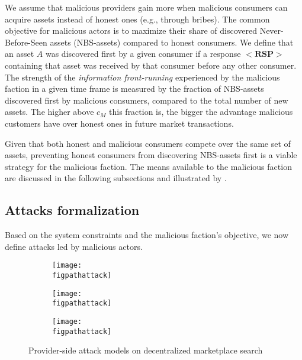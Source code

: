 We assume that malicious providers gain more when malicious consumers can acquire assets instead of honest ones (e.g., through bribes). 
The common objective for malicious actors is to maximize their share of discovered Never-Before-Seen assets (NBS-assets) compared to honest consumers.
We define that an asset $A$ was discovered first by a given consumer if a response $\mathbf{<RSP>}$ containing that asset was received by that consumer before any other consumer. 
The strength of the \emph{information front-running} experienced by the malicious faction in a given time frame is measured by the fraction of NBS-assets discovered first by malicious consumers, compared to the total number of new assets. 
The higher above $c_{M}$ this fraction is, the bigger the advantage malicious customers have over honest ones in future market transactions.

Given that both honest and malicious consumers compete over the same set of assets, preventing honest consumers from discovering NBS-assets first is a viable strategy for the malicious faction. 
The means available to the malicious faction are discussed in the following subsections and illustrated by .

\subsection{Attacks formalization}

Based on the system constraints and the malicious faction's objective, we now define attacks led by malicious actors.

\begin{figure}
    \centering
    \begin{subfigure}{\linewidth}
        \centering
    \texttt{[image: \\figpathattack]}
        \label{fig:fault_free}
    \end{subfigure}
    \begin{subfigure}{\linewidth}
        \centering
        \texttt{[image: \\figpathattack]}
        \label{fig:content_attack}
    \end{subfigure}
    \begin{subfigure}{\linewidth}
        \centering
        \texttt{[image: \\figpathattack]}
        \label{fig:timing_attack}
    \end{subfigure}
    \caption{Provider-side attack models on decentralized marketplace search}\vspace{-0.5cm}
    \label{fig:attack_model}
\end{figure}

